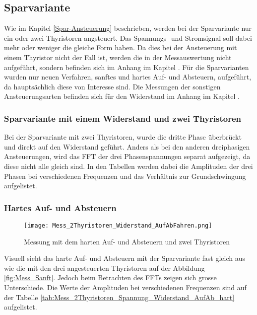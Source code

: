 \newpage
\subsection{Sparvariante}
Wie im Kapitel \ref{Spar-Ansteuerung} beschrieben, werden bei der Sparvariante nur ein oder zwei Thyristoren angsteuert. Das Spannungs- und Stromsignal soll dabei mehr oder weniger die gleiche Form haben. Da dies bei der Ansteuerung mit einem Thyristor nicht der Fall ist, werden die in der Messauswertung nicht aufgeführt, sondern befinden sich im Anhang im Kapitel . Für die Sparvarianten wurden nur neuen Verfahren, sanftes und hartes Auf- und Absteuern, aufgeführt, da hauptsächlich diese von Interesse sind. Die Messungen der sonstigen Ansteuerungsarten befinden sich für den Widerstand im Anhang im Kapitel .


\subsubsection{Sparvariante mit einem Widerstand und zwei Thyristoren}
Bei der Sparvariante mit zwei Thyristoren, wurde die dritte Phase überbrückt und direkt auf den Widerstand geführt. Anders als bei den anderen dreiphasigen Ansteuerungen, wird das FFT der drei Phasenspannungen separat aufgezeigt, da diese nicht alle gleich sind. In den Tabellen werden dabei die Amplituden der drei Phasen bei verschiedenen Frequenzen und das Verhältnis zur Grundschwingung aufgelistet. 


\subsubsection*{Hartes Auf- und Absteuern}

\begin{figure}[ht!]
	\centering
	\texttt{[image: Mess\_2Thyristoren\_Widerstand\_AufAbFahren.png]}	
	\caption{Messung mit dem harten Auf- und Absteuern und zwei Thyristoren}\label{Mess_2Thyristoren_Widerstand_AufAbFahren}	
\end{figure}

Visuell sieht das harte Auf- und Absteuern mit der Sparvariante fast gleich aus wie die mit den drei angesteuerten Thyristoren auf der Abbildung \ref{fig:Mess_Sanft}. Jedoch beim Betrachten des FFTs zeigen sich grosse Unterschiede. Die Werte der Amplituden bei verschiedenen Frequenzen sind auf der Tabelle \ref{tab:Mess_2Thyristoren_Spannung_Widerstand_AufAb_hart} aufgelistet.

